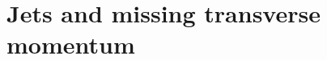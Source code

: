 \documentclass[oneside, letterpaper, 12pt, oldfontcommands]{memoir}
\begin{document}


\section{Jets and missing transverse momentum} \label{sec:reconstruction_jetmet}
\end{document}
